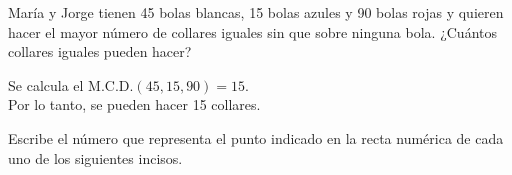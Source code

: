\documentclass[12pt,addpoints]{evalua}
\begin{document}
\begin{questions}
    \begin{multicols}{2}
    \end{multicols}


    \question[6] María y Jorge tienen 45 bolas blancas, 15 bolas azules y 90 bolas rojas y quieren hacer el mayor número de collares iguales sin que sobre ninguna bola. ¿Cuántos collares iguales pueden hacer?
  
    \begin{solutionbox}{4cm}
        Se calcula el M.C.D.$(45,15,90) = 15$.\\
        Por lo tanto, se pueden hacer 15 collares.
    \end{solutionbox}


    \question[4] Escribe el número que representa el punto indicado en la recta numérica de cada uno de los siguientes incisos.

    \begin{multicols}{2}
\end{multicols}
\end{questions}
\end{document}
